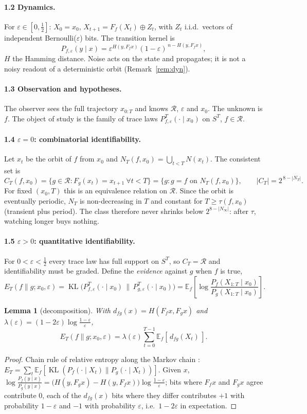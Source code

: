 \documentclass[11pt,a4paper]{article}
\newtheorem{lemma}{Lemma}
\theoremstyle{remark}
\newcommand{\eps}{\varepsilon}
\newcommand{\R}{\mathcal{R}}
\newcommand{\E}{\mathbb{E}}
\DeclareMathOperator{\KL}{KL}
\begin{document}
\paragraph{1.2 Dynamics.}
For $\eps\in[0,\tfrac12]$: $X_0=x_0$, $X_{t+1}=F_f(X_t)\oplus Z_t$, with $Z_t$ i.i.d.\ vectors of independent Bernoulli($\eps$) bits. The transition kernel is
\[
P_{f,\eps}(y\mid x)=\eps^{H(y,F_f x)}(1-\eps)^{\,n-H(y,F_f x)},
\]
$H$ the Hamming distance. Noise acts on the state and propagates; it is not a noisy readout of a deterministic orbit (Remark~\ref{rem:dyn}).

\paragraph{1.3 Observation and hypotheses.}
The observer sees the full trajectory $x_{0:T}$ and knows $\R$, $\eps$ and $x_0$. The unknown is $f$. The object of study is the family of trace laws $P^T_{f,\eps}(\cdot\mid x_0)$ on $S^T$, $f\in\R$.

\paragraph{1.4 $\eps=0$: combinatorial identifiability.}
Let $x_t$ be the orbit of $f$ from $x_0$ and $N_T(f,x_0)=\bigcup_{t<T}N(x_t)$. The consistent set is
\[
C_T(f,x_0)=\{g\in\R:F_g(x_t)=x_{t+1}\ \forall t<T\}=\{g:g=f\text{ on }N_T(f,x_0)\},\qquad |C_T|=2^{\,8-|N_T|}.
\]
For fixed $(x_0,T)$ this is an equivalence relation on $\R$. Since the orbit is eventually periodic, $N_T$ is non-decreasing in $T$ and constant for $T\ge\tau(f,x_0)$ (transient plus period). The class therefore never shrinks below $2^{8-|N_\infty|}$: after $\tau$, watching longer buys nothing.

\paragraph{1.5 $\eps>0$: quantitative identifiability.}
For $0<\eps<\tfrac12$ every trace law has full support on $S^T$, so $C_T=\R$ and identifiability must be graded. Define the \emph{evidence} against $g$ when $f$ is true,
\[
E_T(f\|g;x_0,\eps)=\KL\!\big(P^T_{f,\eps}(\cdot\mid x_0)\,\big\|\,P^T_{g,\eps}(\cdot\mid x_0)\big)=\E_f\!\left[\log\frac{P_f(X_{1:T}\mid x_0)}{P_g(X_{1:T}\mid x_0)}\right].
\]

\begin{lemma}[decomposition]\label{lem:decomp}
With $d_{fg}(x)=H(F_fx,F_gx)$ and $\lambda(\eps)=(1-2\eps)\log\frac{1-\eps}{\eps}$,
\[
E_T(f\|g;x_0,\eps)=\lambda(\eps)\sum_{t=0}^{T-1}\E_f[\,d_{fg}(X_t)\,].
\]
\end{lemma}
\begin{proof}
Chain rule of relative entropy along the Markov chain \citep[Thm.~2.5.3]{CoverThomas}: $E_T=\sum_t\E_f[\KL(P_f(\cdot\mid X_t)\|P_g(\cdot\mid X_t))]$. Given $x$, $\log\frac{P_f(y\mid x)}{P_g(y\mid x)}=\big(H(y,F_gx)-H(y,F_fx)\big)\log\frac{1-\eps}{\eps}$; bits where $F_fx$ and $F_gx$ agree contribute $0$, each of the $d_{fg}(x)$ bits where they differ contributes $+1$ with probability $1-\eps$ and $-1$ with probability $\eps$, i.e.\ $1-2\eps$ in expectation.
\end{proof}
\end{document}
